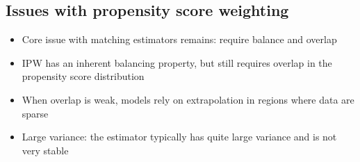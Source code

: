 \documentclass[10pt]{article}
\begin{document}
\subsection{Issues with propensity score weighting}
\begin{itemize}
    \item Core issue with matching estimators remains: require balance and overlap 
    \item IPW has an inherent balancing property, but still requires overlap in the propensity score distribution
    \item When overlap is weak, models rely on extrapolation in regions where data are sparse 
    \item Large variance: the estimator typically has quite large variance and is not very stable 
\end{itemize}
\newpage 
\end{document}
